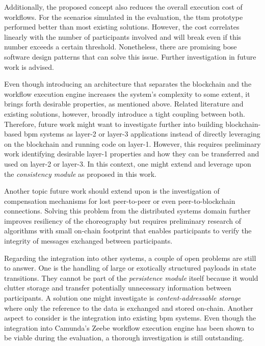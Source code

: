 Additionally, the proposed concept also reduces the overall execution cost of workflows. For the scenarios simulated in the evaluation, the \gls{ttsm} prototype performed better than most existing solutions. However, the cost correlates linearly with the number of participants involved and will break even if this number exceeds a certain threshold. Nonetheless, there are promising \gls{bose} software design patterns that can solve this issue. Further investigation in future work is advised.

Even though introducing an architecture that separates the blockchain and the workflow execution engine increases the system's complexity to some extent, it brings forth desirable properties, as mentioned above. Related literature and existing solutions, however, broadly introduce a tight coupling between both. Therefore, future work might want to investigate further into building blockchain-based \gls{bpm} systems as layer-2 or layer-3 applications instead of directly leveraging on the blockchain and running code on layer-1. However, this requires preliminary work identifying desirable layer-1 properties and how they can be transferred and used on layer-2 or layer-3. In this context, one might extend and leverage upon the \textit{consistency module} as proposed in this work.

Another topic future work should extend upon is the investigation of compensation mechanisms for lost peer-to-peer or even peer-to-blockchain connections. Solving this problem from the distributed systems domain further improves resiliency of the choreography but requires preliminary research of algorithms with small on-chain footprint that enables participants to verify the integrity of messages exchanged between participants.


Regarding the integration into other systems, a couple of open problems are still to answer. One is the handling of large or exotically structured payloads in state transitions. They cannot be part of the \textit{persistence module} itself because it would clutter storage and transfer potentially unnecessary information between participants. A solution one might investigate is \textit{content-addressable storage} where only the reference to the data is exchanged and stored on-chain. Another aspect to consider is the integration into existing \gls{bpm} systems. Even though the integration into Camunda's Zeebe workflow execution engine has been shown to be viable during the evaluation, a thorough investigation is still outstanding.

